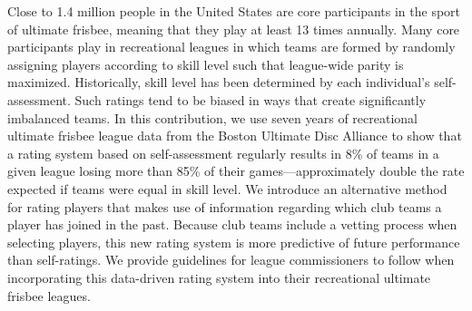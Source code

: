 Close to 1.4 million people in the United States are core participants in the sport of ultimate frisbee, meaning that they play at least 13 times annually. Many core participants play in recreational leagues in which teams are formed by randomly assigning players according to skill level such that league-wide parity is maximized. Historically, skill level has been determined by each individual’s self-assessment. Such ratings tend to be biased in ways that create significantly imbalanced teams. In this contribution, we use seven years of recreational ultimate frisbee league data from the Boston Ultimate Disc Alliance to show that a rating system based on self-assessment regularly results in 8\% of teams in a given league losing more than 85\% of their games---approximately double the rate expected if teams were equal in skill level.  We introduce an alternative method for rating players that makes use of information regarding which club teams a player has joined in the past. Because club teams include a vetting process when selecting players, this new rating system is more predictive of future performance than self-ratings. We provide guidelines for league commissioners to follow when incorporating this data-driven rating system into their recreational ultimate frisbee leagues.